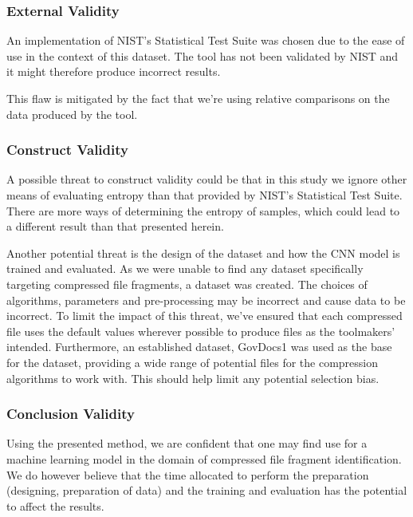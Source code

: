 \documentclass[conference]{IEEEtran}
\begin{document}
\subsubsection{External Validity}
An implementation of NIST's Statistical Test Suite was chosen due to the ease of use in the context of this dataset. The tool has not been validated by NIST and it might therefore produce incorrect results.

This flaw is mitigated by the fact that we're using relative comparisons on the data produced by the tool.

\subsubsection{Construct Validity}
A possible threat to construct validity could be that in this study we ignore other means of evaluating entropy than that provided by NIST's Statistical Test Suite. There are more ways of determining the entropy of samples, which could lead to a different result than that presented herein.

Another potential threat is the design of the dataset and how the CNN model is trained and evaluated. As we were unable to find any dataset specifically targeting compressed file fragments, a dataset was created. The choices of algorithms, parameters and pre-processing may be incorrect and cause data to be incorrect. To limit the impact of this threat, we've ensured that each compressed file uses the default values wherever possible to produce files as the toolmakers' intended. Furthermore, an established dataset, GovDocs1 was used as the base for the dataset, providing a wide range of potential files for the compression algorithms to work with. This should help limit any potential selection bias.

\subsubsection{Conclusion Validity}
\label{section:conclusion-validity}

Using the presented method, we are confident that one may find use for a machine learning model in the domain of compressed file fragment identification. We do however believe that the time allocated to perform the preparation (designing, preparation of data) and the training and evaluation has the potential to affect the results.
\end{document}
